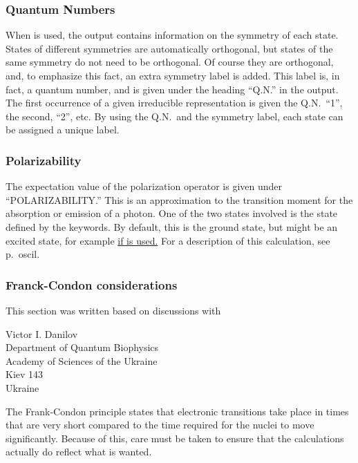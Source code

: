 \subsubsection{Quantum Numbers}
When  is used, the output contains information on the symmetry of
each state.  States of different symmetries are automatically orthogonal, but
states of the same symmetry do not need to be orthogonal. Of course they are
orthogonal, and, to emphasize this fact, an extra symmetry label is added. This
label is, in fact, a quantum number, and is given under the heading ``Q.N.'' in
the output. The first occurrence of a given irreducible representation is given
the Q.N.\ ``1'', the second, ``2'', etc.  By using the Q.N.\ and the symmetry
label, each state can be assigned a unique label.

\subsubsection{Polarizability}
The expectation value of the polarization operator is given under
``POLARIZABILITY.'' This is an approximation to the transition moment
for the absorption or emission of a photon.  One of the two states
involved is the state defined by the keywords.  By default, this is the
ground state, but might be an excited state, for example
\hyperref[pageref]{if  is used.}{ For a description of
this calculation, see  p.~}{}{oscil}.

\subsubsection{Franck-Condon considerations}\label{FC}
This section was written based on discussions with
\begin{center} Victor I. Danilov\\
Department of Quantum Biophysics\\ Academy of Sciences of the Ukraine\\
Kiev 143\\Ukraine\end{center}
The Frank-Condon principle states that electronic transitions take place in
times that are very short compared to the time required for the nuclei to move
significantly.  Because of this, care must be taken to ensure that the
calculations actually do reflect what is wanted.

